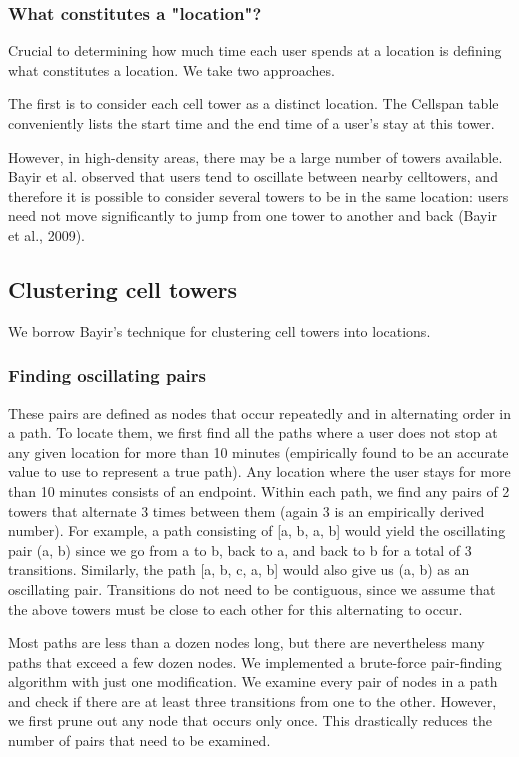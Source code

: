\documentclass[pageno]{jpaper}
\begin{document}
\subsubsection{What constitutes a "location"?}

Crucial to determining how much time each user spends at a location is defining what constitutes a location. We take two approaches. 

The first is to consider each cell tower as a distinct location. The Cellspan table conveniently lists the start time and the end time of a user's stay at this tower. 

However,  in high-density areas, there may be a large number of towers available. Bayir et al. observed that users tend to oscillate between nearby celltowers, and therefore it is possible to consider several towers to be in the same location: users need not move significantly to jump from one tower to another and back (Bayir et al., 2009). 

\subsection{Clustering cell towers}

We borrow Bayir's technique for clustering cell towers into locations.

\subsubsection{Finding oscillating pairs}
These pairs are defined as nodes that occur repeatedly and in alternating order in a path. To locate them, we first find all the paths where a user does not stop at any given location for more than 10 minutes (empirically found to be an accurate value to use to represent a true path). Any location where the user stays for more than 10 minutes consists of an endpoint. Within each path, we find any pairs of 2 towers that alternate 3 times between them (again 3 is an empirically derived number). For example, a path consisting of [a, b, a, b] would yield the oscillating pair (a, b) since we go from a to b, back to a, and back to b for a total of 3 transitions. Similarly, the path [a, b, c, a, b] would also give us (a, b) as an oscillating pair. Transitions do not need to be contiguous, since we assume that the above towers must be close to each other for this alternating to occur. 

Most paths are less than a dozen nodes long, but there are nevertheless many paths that exceed a few dozen nodes. We implemented a brute-force pair-finding algorithm with just one modification. We examine every pair of nodes in a path and check if there are at least three transitions from one to the other. However, we first prune out any node that occurs only once. This drastically reduces the number of pairs that need to be examined.  
\end{document}
